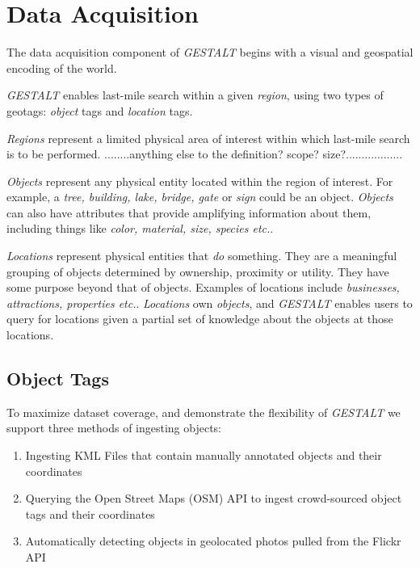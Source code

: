 \section{Data Acquisition}
\label{section:data}

The data acquisition component of \textit{GESTALT} begins with a visual and geospatial encoding of the world. 

\emph{GESTALT} enables last-mile search within a given \emph{region}, using two types of geotags: \emph{object} tags and \emph{location} tags.

\emph{Regions} represent a limited physical area of interest within which last-mile search is to be performed. ........anything else to the definition? scope? size?..................


\emph{Objects} represent any physical entity located within the region of interest. For example, a \textit{tree, building, lake, bridge, gate} or \textit{sign} could be an object. \textit{Objects} can also have attributes that provide amplifying information about them, including things like \textit{color, material, size, species etc.}. 

\emph{Locations} represent physical entities that \textit{do} something. They are a meaningful grouping of objects determined by ownership, proximity or utility. They have some purpose beyond that of objects. Examples of locations include \textit{businesses, attractions, properties etc.}. \textit{Locations} own \textit{objects}, and \emph{GESTALT} enables users to query for locations given a partial set of knowledge about the objects at those locations.

\subsection{Object Tags}
To maximize dataset coverage, and demonstrate the flexibility of \emph{GESTALT} we support three methods of ingesting objects:
\begin{enumerate}
    \item Ingesting KML Files that contain manually annotated objects and their coordinates 
    \item Querying the Open Street Maps (OSM) API to ingest crowd-sourced object tags and their coordinates
    \item Automatically detecting objects in geolocated photos pulled from the Flickr API 
\end{enumerate}

